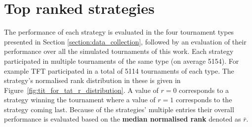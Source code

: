 \documentclass{article}
\newcommand{\numberofalltournaments}{}
\begin{document}
\begin{table}[!htbp]
    \begin{center}
\end{center}
\caption{Output result of a single tournament.}\label{table:output_result}
\end{table}

\section{Top ranked strategies}\label{section:top_performances}

The performance of each strategy is evaluated in the four tournament types
presented in Section \ref{section:data_collection}, followed by an
evaluation of their performance over all the \numberofalltournaments simulated
tournaments of this work. Each strategy participated in multiple tournaments of
the same type (on average 5154). For example TFT participated in a
total of 5114 tournaments of each type. The strategy's normalised rank
distribution in these is given in Figure~\ref{fig:tit_for_tat_r_distribution}. A
value of \(r = 0\) corresponds to a strategy winning the tournament where a
value of \(r = 1\) corresponds to the strategy coming last. Because of the
strategies' multiple entries their overall performance is evaluated based on the
\textbf{median normalised rank} denoted as \(\bar{r}\).
\end{document}
